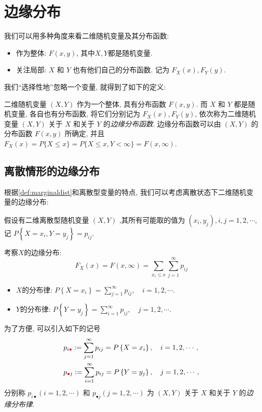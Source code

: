 \section{边缘分布}

我们可以用多种角度来看二维随机变量及其分布函数: 
\begin{itemize}
  \item 作为整体: $F(x, y)$, 其中$X,Y$都是随机变量.
  \item 关注局部: $X$ 和 $Y$ 也有他们自己的分布函数. 记为 $F_X(x), F_Y(y)$.
\end{itemize}

我们``选择性地''忽略一个变量, 就得到了如下的定义:
\begin{definition}[边缘分布]
  \label{def:marginaldist}
  二维随机变量 $(X, Y)$ 作为一个整体, 具有分布函数 $F(x, y)$. 而 $X$ 和 $Y$ 都是随机变量, 各自也有分布函数, 将它们分别记为 $F_X(x), F_Y(y)$, 依次称为二维随机变量 $(X, Y)$ 关于 $X$ 和关于 $Y$ 的\emph{边缘分布函数}. 边缘分布函数可以由 $(X, Y)$ 的分布函数 $F(x, y)$ 所确定, 并且$F_X(x)=P\{X \leq x\}=P\{X \leq x, Y<\infty\}=F(x, \infty)$.
\end{definition}

\subsection{离散情形的边缘分布}
根据\cref{def:marginaldist}和离散型变量的特点, 我们可以考虑离散状态下二维随机变量的边缘分布: 

假设有二维离散型随机变量 $(X, Y)$ ,其所有可能取的值为 $\left(x_i, y_j\right), i, j=1,2, \cdots$, 记 $P\left\{X=x_i, Y=y_j\right\}=p_{i j}$. 
\begin{definition*}
  考察$X$的边缘分布:
  $$
        F_X(x)=F(x, \infty)=\sum_{x_i \leq x} \sum_{j=1}^{\infty} p_{i j}
    $$

    \begin{itemize}
        \item $X$的分布律: $P\left\{X=x_i\right\}=\sum_{j=1}^{\infty} p_{i j}, \quad i=1,2, \cdots .$
        \item $Y$的分布律: $P\left\{Y=y_j\right\}=\sum_{i=1}^{\infty} p_{i j}, \quad j=1,2, \cdots .$
    \end{itemize}

    为了方便, 可以引入如下的记号
    $$
        \begin{aligned}
             & p_{i {{\color{red}\bullet}}}:=\sum_{j=1}^{\infty} p_{i j}=P\left\{X=x_i\right\}, \quad i=1,2, \cdots,   \\
             & p_{{{{\color{red}\bullet}}} j}:=\sum_{i=1}^{\infty} p_{i j}=P\left\{Y=y_j\right\}, \quad j=1,2, \cdots,
        \end{aligned}
    $$
    分别称 $p_{i \bullet} (i=1,2, \cdots)$ 和 $p_{\bullet j}(j=1,2, \cdots)$ 为 $(X, Y)$ 关于 $X$ 和关于 $Y$ 的\emph{边缘分布律}.
\end{definition*}
    
